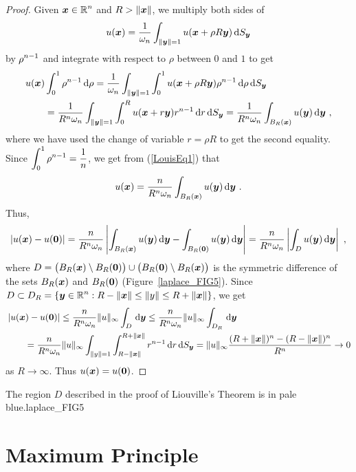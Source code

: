 \begin{proof}
Given $\displaystyle {\bm{x}} \in \mathbb{R}^n$ and $R>\|{\bm{x}}\|$, we
multiply both sides of
\[
u({\bm{x}}) = \frac{1}{\omega_n} \int_{\|{\bm{y}}\|=1}
u({\bm{x}} + \rho R {\bm{y}}) \,\mathrm{d}{S_{{\bm{y}}}}
\]
by $\displaystyle \rho^{n-1}$ and integrate with respect to $\rho$
between $0$ and $1$ to get
\begin{align}
&u({\bm{x}})\int_0^1 \rho^{n-1} \,\mathrm{d}{\rho} =
\frac{1}{\omega_n} \int_{\|{\bm{y}}\|=1} \int_0^1
u({\bm{x}} + \rho R {\bm{y}}) \rho^{n-1} \,\mathrm{d}{\rho} \,\mathrm{d}{S_{{\bm{y}}}}
\nonumber \\
&\qquad = \frac{1}{R^n \omega_n} \int_{\|{\bm{y}}\|=1} \int_0^R
u({\bm{x}} + r {\bm{y}}) r^{n-1} \,\mathrm{d}{r} \,\mathrm{d}{S_{{\bm{y}}}}
= \frac{1}{R^n \omega_n} \int_{B_R({\bm{x}})} u({\bm{y}}) \,\mathrm{d}{{\bm{y}}}
\ , \label{LouisEq1}
\end{align}
where we have used the change of variable $r=\rho R$ to get the second
equality.
Since
$\displaystyle \int_0^1 \rho^{n-1} = \frac{1}{n}$, we get from
(\ref{LouisEq1}) that
\[
u({\bm{x}}) = \frac{n}{R^n \omega_n} \int_{B_R({\bm{x}})} u({\bm{y}})
\,\mathrm{d}{{\bm{y}}} \ .
\]
Thus,
\[
\left| u({\bm{x}}) - u({\bm{0}}) \right|
= \frac{n}{R^n \omega_n} \left| 
\int_{B_R({\bm{x}})} u({\bm{y}}) \,\mathrm{d}{{\bm{y}}}
- \int_{B_R({\bm{0}})} u({\bm{y}}) \,\mathrm{d}{{\bm{y}}} \right|
= \frac{n}{R^n \omega_n} \left| 
\int_D u({\bm{y}}) \,\mathrm{d}{{\bm{y}}} \right| \ ,
\]
where $D = \big(B_R({\bm{x}}) \setminus B_R({\bm{0}})\big) \cup 
\big(B_R({\bm{0}}) \setminus B_R({\bm{x}})\big)$ is the symmetric difference
of the sets $B_R({\bm{x}})$ and $B_R({\bm{0}})$ (Figure~\ref{laplace_FIG5}).
Since
$\displaystyle D \subset D_R = \{ {\bm{y}} \in \mathbb{R}^n :
R-\|{\bm{x}}\| \leq \|y\| \leq R+\|{\bm{x}}\|\}$,
we get
\begin{align*}
&\left| u({\bm{x}}) - u({\bm{0}}) \right|
\leq \frac{n}{R^n \omega_n} \|u\|_{\infty} \int_D \,\mathrm{d}{{\bm{y}}}
\leq \frac{n}{R^n \omega_n} \|u\|_{\infty} \int_{D_R} \,\mathrm{d}{{\bm{y}}} \\
&\qquad = \frac{n}{R^n \omega_n} \|u\|_{\infty} \int_{\|y\|=1}
\int_{R-\|{\bm{x}}\|}^{R+\|{\bm{x}}\|} r^{n-1} \,\mathrm{d}{r} \,\mathrm{d}{S_{{\bm{y}}}}
= \|u\|_{\infty} \frac{ (R+\|{\bm{x}}\|)^n - (R-\|{\bm{x}}\|)^n}{R^n}
\to 0 
\end{align*}
as $R \to \infty$.  Thus $u({\bm{x}}) = u({\bm{0}})$.
\end{proof}

{The region $D$ described in the proof of Liouville's Theorem is
in pale blue.}{laplace_FIG5}

\section{Maximum Principle} \label{SectLaplaceMaxPrinc}

